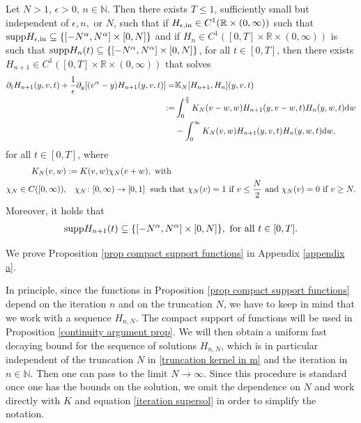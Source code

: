 \documentclass[11pt]{article}
\numberwithin{equation}{section}
\newcommand{\supp}{\textup{supp}}
\newcommand{\der}{\textup{d}}
\begin{document}
\begin{prop}\label{prop compact support functions}
Let $N>1$, $\epsilon>0$, $n\in\mathbb{N}$. Then there exists $T\leq 1$, sufficiently small but independent of $\epsilon,n,$ or $N$, such that if $H_{\epsilon,\textup{in}}\in C^{1}(\mathbb{R}\times(0,\infty))$ such that  $\supp  H_{\epsilon,\textup{in}}\subseteq \{[-N^{\alpha},N^{\alpha}]\times[0,N]\}$ and if $H_{n}\in C^{1}([0,T]\times\mathbb{R}\times (0,\infty))$ is such that  $\supp  H_{n}(t)\subseteq \{[-N^{\alpha},N^{\alpha}]\times[0,N]\}$, for all $t\in[0,T]$, then there exists $H_{n+1}\in C^{1}([0,T]\times\mathbb{R}\times (0,\infty))$ that solves
    \begin{align}
 \partial_{t}H_{n+1}(y,v,t)+\frac{1}{\epsilon}\partial_{y}[(v^{\alpha}-y)H_{n+1}(y,v,t)]=&\mathbb{K}_{N}[H_{n+1},H_{n}](y,v,t)\label{equation appendix}\\ 
 :=&\int_{0}^{\frac{v}{2}}K_{N}(v-w,w)H_{n+1}(y,v-w,t)H_{n}(y,w,t)\der w\nonumber \\
   &-\int_{0}^{\infty}K_{N}(v,w)H_{n+1}(y,v,t)H_{n}(y,w,t)\der w ,\nonumber
\end{align}
for all $t\in[0,T]$, where
\begin{align}
K_{N}(v,w)&:=K(v,w)\chi_{N}(v+w), \textup{ with }\label{truncation kernel in m}\\
\chi_{N}\in C([0,\infty)),&  \quad \chi_{N}\colon [0,\infty)\rightarrow [0,1] \; \mbox{ such that } \chi_{N}(v)=1
\mbox{ if } v\leq \frac{N}{2} \mbox{ and } \chi_{N}(v)=0 \mbox{ if } v\geq N.
\nonumber
\end{align}
Moreover, it holds that 
\begin{align}
    \supp H_{n+1}(t)\subseteq \{[-N^{\alpha},N^{\alpha}]\times[0,N]\}, \textup{ for all }t\in[0,T].
\end{align}
\end{prop}
 We prove Proposition \ref{prop compact support functions} in Appendix \ref{appendix a}.
\begin{rmk}\label{first remark compact support}
In principle, since the functions in Proposition \ref{prop compact support functions} depend on the iteration $n$ and on the truncation $N$,  we have to keep in mind that we work with a sequence $H_{n,N}$. The compact support of functions will be used in Proposition \ref{continuity argument prop}. We will then obtain a uniform  fast decaying bound for the sequence of solutions $H_{n,N}$, which is in particular independent of the truncation $N$ in \eqref{truncation kernel in m} and the iteration in $n\in\mathbb{N}$. Then one can pass to the limit $N \to \infty$. Since this procedure is standard once one has the bounds on the solution, we omit the dependence on $N$ and work directly with $K$ and equation \eqref{iteration supersol} in order to simplify the notation.
\end{rmk}
\end{document}
